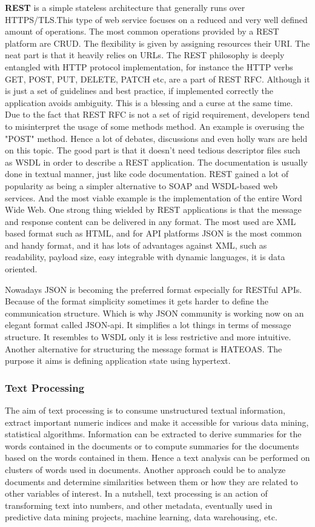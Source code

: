 \textbf{REST} is a simple stateless architecture that generally runs over HTTPS/TLS.This type of web service focuses on a reduced and very well defined amount of operations. The most common operations provided by a REST platform are CRUD. The flexibility is given by assigning resources their URI. The neat part is that it heavily relies on URLs. The REST philosophy is deeply entangled with HTTP protocol implementation, for instance the HTTP verbs GET, POST, PUT, DELETE, PATCH etc, are a part of REST RFC. Although it is just a set of guidelines and best practice, if implemented correctly the application avoids ambiguity. This is a blessing and a curse at the same time. Due to the fact that REST RFC is not a set of rigid requirement, developers tend to misinterpret the usage of some methods method. An example is overusing the "POST" method. Hence a lot of debates, discussions and even holly wars are held on this topic. The good part is that it doesn't need tedious descriptor files such as WSDL in order to describe a REST application. The documentation is usually done in textual manner, just like code documentation. REST gained a lot of popularity as being a simpler alternative to SOAP and WSDL-based web services. And the most viable example is the implementation of the entire Word Wide Web. One strong thing wielded by REST applications is that the message and response content can be delivered in any format. The most used are XML based format such as HTML, and for API platforms JSON is the most common and handy format, and it has lots of advantages against XML, such as readability, payload size, easy integrable with dynamic languages, it is data oriented.

Nowadays JSON is becoming the preferred format especially for RESTful APIs. Because of the format simplicity sometimes it gets harder to define the communication structure. Which is why JSON community is working now on an elegant format called JSON-api. It simplifies a lot things in terms of message structure. It resembles to WSDL only it is less restrictive and more intuitive. Another alternative for structuring the message format is HATEOAS. The purpose it aims is defining application state using hypertext.

\subsubsection{Text Processing}
The aim of text processing is to consume unstructured textual information, extract important numeric indices and make it accessible for various data mining, statistical algorithms. Information can be extracted to derive summaries for the words contained in the documents or to compute summaries for the documents based on the words contained in them. Hence a text analysis can be performed on clusters of words used in documents. Another approach could be to analyze documents and determine similarities between them or how they are related to other variables of interest. In a nutshell, text processing is an action of transforming text into numbers, and other metadata, eventually used in predictive data mining projects, machine learning, data warehousing, etc.

